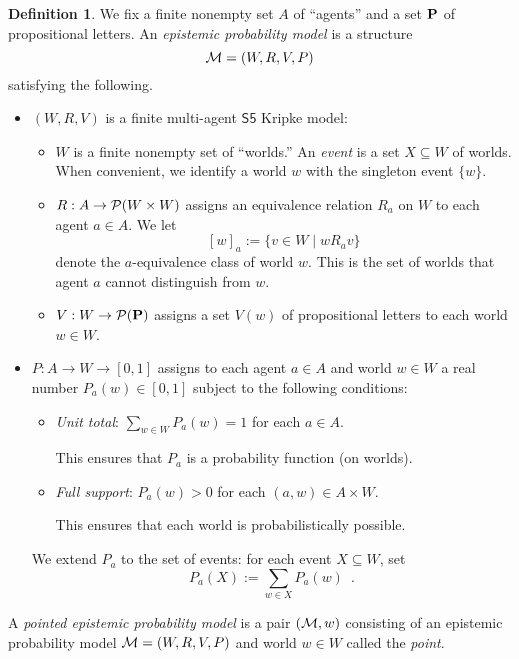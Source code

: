 \documentclass[12pt]{article}
\theoremstyle{definition}
\newtheorem{definition}[theorem]{Definition}
\newcommand{\pow}{{\cal P}}    %
\newcommand{\M}{{\cal M}}      %
\newcommand{\Prop}{{\bf P}}    %
\begin{document}
\begin{definition}
  \label{definition:epistemic-probability-model}
  We fix a finite nonempty set $A$ of ``agents'' and a set $\Prop$ of
  propositional letters.  An \emph{epistemic probability model} 
  is a structure
  \[
  \M=(W,R,V,P)
  \]
  satisfying the following.
  \begin{itemize} 
  \item $(W,R,V)$ is a finite multi-agent $\mathsf{S5}$ Kripke model:
    \begin{itemize}
    \item $W$ is a finite nonempty set of ``worlds.''  An \emph{event}
      is a set $X\subseteq W$ of worlds.  When convenient, we identify a world
      $w$ with the singleton event $\{w\}$.
      
    \item $R:A\to\pow(W\times W)$ assigns an equivalence relation $R_a$
      on $W$ to each agent $a\in A$.  We let
      \[
      [w]_a:=\{v\in W\mid wR_av\}
      \]
      denote the $a$-equivalence class of world $w$.  This is the
      set of worlds that agent $a$ cannot distinguish from $w$.

    \item $V:W\to\pow(\Prop)$ assigns a set $V(w)$ of propositional
      letters to each world $w\in W$.
    \end{itemize}

  \item $P:A \to W \to[0,1]$ assigns to each agent $a\in A$
    and world $w\in W$ a real number $P_a(w)\in[0,1]$ subject
    to the following conditions:
    \begin{itemize}
    \item \emph{Unit total\/}: $\sum_{w\in W}P_a(w)=1$ for each $a\in A$.

    This ensures that $P_a$ is a probability function (on worlds).

    \item \emph{Full support\/}: $P_a(w)>0$ for each $(a,w)\in A\times W$.

    This ensures that each world is probabilistically possible.
    \end{itemize}
    We extend $P_a$
    to the set of events: for each event $X\subseteq W$, set
    \[
    P_a(X):=\sum_{w\in X}P_a(w)\enspace.
    \]
  \end{itemize}
  A \emph{pointed epistemic probability model} is a pair $(\M,w)$
  consisting of an epistemic probability model $\M=(W,R,V,P)$ and
  world $w\in W$ called the \emph{point}.
\end{definition}
\end{document}
